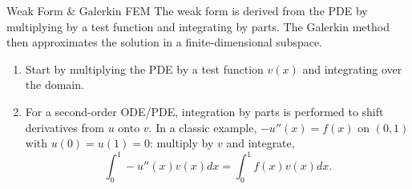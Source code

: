 \documentclass[a4paper,11pt]{report}
\begin{document}
\begin{outline}{Weak Form \& Galerkin FEM}{}
    The weak form is derived from the PDE by multiplying by a test function and integrating by parts. The Galerkin method then approximates the solution in a finite-dimensional subspace.
    \medskip
    \begin{enumerate}
        \item Start by multiplying the PDE by a test function $v(x)$ and integrating over the domain.
        \item For a second-order ODE/PDE, integration by parts is performed to shift derivatives from $u$ onto $v$.
              In a classic example, $-u''(x)=f(x)$ on $(0,1)$ with $u(0)=u(1)=0$:
              multiply by $v$ and integrate,
              $$\int_0^1 -u''(x)v(x)dx = \int_0^1 f(x)v(x)dx.$$


\end{enumerate}
\end{outline}
\end{document}

